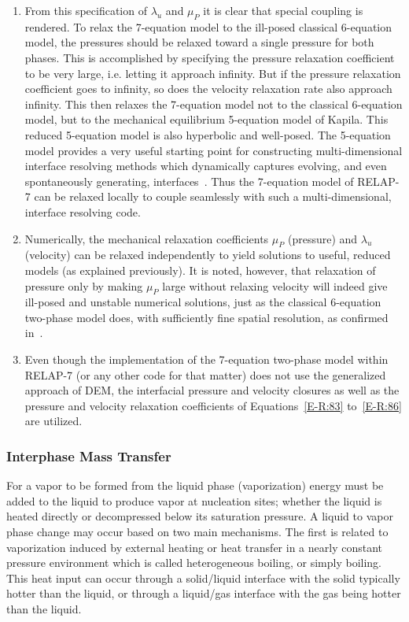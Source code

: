 \begin{remark} 
\begin{enumerate}
\item From this specification of $\lambda_u$ and $\mu_P$ it is clear
that special coupling is rendered.  To relax the 7-equation model to
the ill-posed classical 6-equation model, the pressures should be
relaxed toward a single pressure for both phases.  This is
accomplished by specifying the pressure relaxation coefficient to be
very large, i.e. letting it approach infinity.  But if the pressure
relaxation coefficient goes to infinity, so does the velocity
relaxation rate also approach infinity.  This then relaxes the
7-equation model not to the classical 6-equation model, but to the
mechanical equilibrium 5-equation model of Kapila.  This reduced
5-equation model is also hyperbolic and well-posed. The 5-equation
model provides a very useful starting point for constructing
multi-dimensional interface resolving methods which dynamically
captures evolving, and even spontaneously generating,
interfaces~\cite{Saurel_2009}. Thus the 7-equation model of RELAP-7
can be relaxed locally to couple seamlessly with such a
multi-dimensional, interface resolving code.
\item Numerically, the mechanical relaxation coefficients $\mu_P$
(pressure) and $\lambda_u$ (velocity) can be relaxed independently to
yield solutions to useful, reduced models (as explained previously).  It
is noted, however, that relaxation of pressure only by making $\mu_P$
large without relaxing velocity will indeed give ill-posed and
unstable numerical solutions, just as the classical 6-equation
two-phase model does, with sufficiently fine spatial resolution, as
confirmed in~\cite{SEM,Herrard_2005}.
\item Even though the implementation of the 7-equation two-phase
model within RELAP-7 (or any other code for that matter) does not use
the generalized approach of DEM, the interfacial pressure and velocity
closures as well as the pressure and velocity relaxation coefficients
of Equations~\eqref{E-R:83} to~\eqref{E-R:86} are utilized.
\end{enumerate}
\end{remark}
\subsubsection{Interphase Mass Transfer}
For a vapor to be formed from the liquid phase (vaporization) energy
must be added to the liquid to produce vapor at nucleation sites;
whether the liquid is heated directly or decompressed below its
saturation pressure.  A liquid to vapor phase change may occur based
on two main mechanisms.  The first is related to vaporization induced
by external heating or heat transfer in a nearly constant pressure
environment which is called heterogeneous boiling, or simply
boiling.  This heat input can occur through a solid/liquid
interface with the solid typically hotter than the liquid, or through
a liquid/gas interface with the gas being hotter than the liquid.

